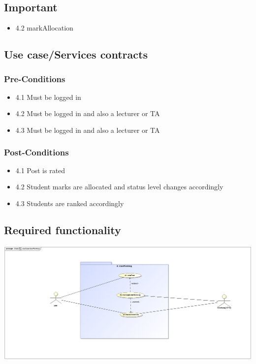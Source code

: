 \documentclass[hidelinks, 12pt, oneside]{article}
\begin{document}
\subsection{Important}
\begin{itemize}
  \item 4.2 markAllocation
\end{itemize}

\subsection{Use case/Services contracts}
\subsubsection{Pre-Conditions}								%
\begin{itemize}
 \item 4.1 Must be logged in
  \item 4.2 Must be logged in and also a lecturer or TA
  \item 4.3 Must be logged in and also a lecturer or TA
\end{itemize}

\subsubsection{Post-Conditions}%
\begin{itemize}
  \item 4.1 Post is rated
  \item 4.2 Student marks are allocated and status level changes accordingly
  \item 4.3 Students are ranked accordingly
\end{itemize}

\subsection{Required functionality} 
\includegraphics[scale=.9]{Kgomotso/graphics/useCaseUserRanking.eps}\\
\end{document}
